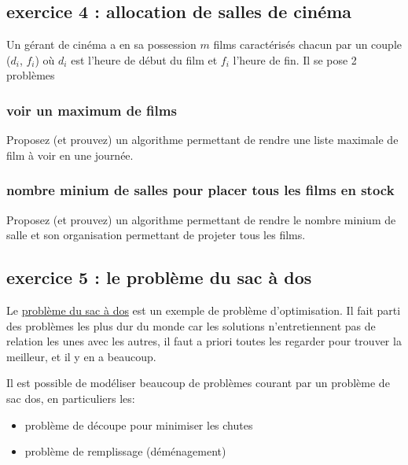 \documentclass[
]{article}
\providecommand{\tightlist}{%
  \setlength{\itemsep}{0pt}\setlength{\parskip}{0pt}}
\begin{document}
\hypertarget{exercice-4-allocation-de-salles-de-cinuxe9ma}{%
\subsection{exercice 4 : allocation de salles de
cinéma}\label{exercice-4-allocation-de-salles-de-cinuxe9ma}}

Un gérant de cinéma a en sa possession \(m\) films caractérisés chacun
par un couple (\(d_i\), \(f_i\)) où \(d_i\) est l'heure de début du film
et \(f_i\) l'heure de fin. Il se pose 2 problèmes

\hypertarget{voir-un-maximum-de-films}{%
\subsubsection{voir un maximum de
films}\label{voir-un-maximum-de-films}}

Proposez (et prouvez) un algorithme permettant de rendre une liste
maximale de film à voir en une journée.

\hypertarget{nombre-minium-de-salles-pour-placer-tous-les-films-en-stock}{%
\subsubsection{nombre minium de salles pour placer tous les films en
stock}\label{nombre-minium-de-salles-pour-placer-tous-les-films-en-stock}}

Proposez (et prouvez) un algorithme permettant de rendre le nombre
minium de salle et son organisation permettant de projeter tous les
films.

\hypertarget{exercice-5-le-probluxe8me-du-sac-uxe0-dos}{%
\subsection{exercice 5 : le problème du sac à
dos}\label{exercice-5-le-probluxe8me-du-sac-uxe0-dos}}

Le
\href{https://fr.wikipedia.org/wiki/Probl\%C3\%A8me_du_sac_\%C3\%A0_dos}{problème
du sac à dos} est un exemple de problème d'optimisation. Il fait parti
des problèmes les plus dur du monde car les solutions n'entretiennent
pas de relation les unes avec les autres, il faut a priori toutes les
regarder pour trouver la meilleur, et il y en a beaucoup.

Il est possible de modéliser beaucoup de problèmes courant par un
problème de sac dos, en particuliers les:

\begin{itemize}
\tightlist
\item
  problème de découpe pour minimiser les chutes
\item
  problème de remplissage (déménagement)
\end{itemize}
\end{document}
